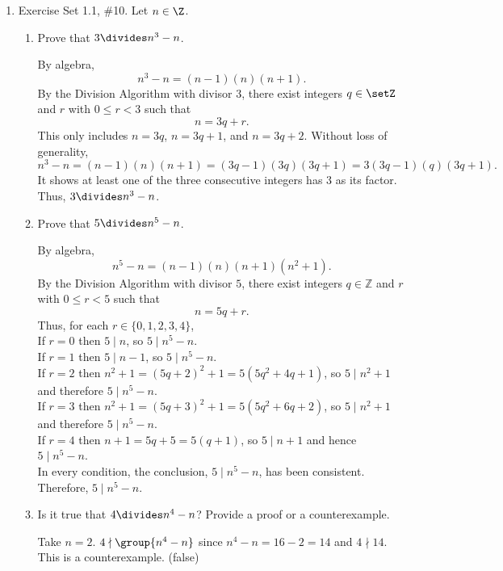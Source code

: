 \begin{enumerate}
  \item Exercise Set 1.1, \#10. Let $n\in \Z$.
  \begin{enumerate}
    \item Prove that $3\divides n^{3}-n$.
    \begin{subprove}
      By algebra,
      \[
        n^{3}-n = (n-1)(n)(n+1).
      \]
      By the Division Algorithm with divisor $3$, there exist integers $q\in\setZ$ and $r$ with $0\le r<3$ such that
      \[
        n = 3q + r.
      \] 
      This only includes $n = 3q$, $n = 3q + 1$, and $n = 3q + 2$.
      Without loss of generality, 
      \[
        n^{3}-n = (n-1)(n)(n+1)=(3q-1)(3q)(3q+1)=3(3q-1)(q)(3q+1).
      \]
      It shows at least one of the three consecutive integers has $3$ as its factor.
      Thus, $3\divides n^{3}-n$.
    \end{subprove}
    \item Prove that $5\divides n^{5}-n$.
    \begin{subprove}
      By algebra,
      \[
      n^{5}-n = (n-1)(n)(n+1)(n^{2}+1).
      \]
      By the Division Algorithm with divisor $5$, there exist integers $q\in\mathbb{Z}$ and $r$ with $0\le r<5$ such that
      \[
      n = 5q + r.
      \]
      Thus, for each $r\in\{0,1,2,3,4\}$, \\
      If $r=0$ then $5\mid n$, so $5\mid n^{5}-n$.\\
      If $r=1$ then $5\mid n-1$, so $5\mid n^{5}-n$.\\
      If $r=2$ then $n^{2}+1=(5q+2)^{2}+1=5(5q^{2}+4q+1)$, so $5\mid n^{2}+1$ and therefore $5\mid n^{5}-n$.\\
      If $r=3$ then $n^{2}+1=(5q+3)^{2}+1=5(5q^{2}+6q+2)$, so $5\mid n^{2}+1$ and therefore $5\mid n^{5}-n$.\\
      If $r=4$ then $n+1=5q+5=5(q+1)$, so $5\mid n+1$ and hence $5\mid n^{5}-n$.\\
      In every condition, the conclusion, $5\mid n^{5}-n$, has been consistent. Therefore, $5\mid n^{5}-n$.
    \end{subprove}
    \item Is it true that $4 \divides n^{4}-n$? Provide a proof or a counterexample.
    \begin{subanswer}
      Take $n=2$. $4 \nmid \group{n^{4}-n}$ since $n^{4}-n=16-2=14$ and $4\nmid14$. This is a counterexample. (false)
    \end{subanswer}
  \end{enumerate}

  \newpage


\end{enumerate}
